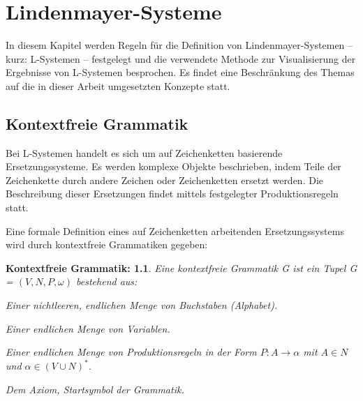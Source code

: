\chapter{Lindenmayer-Systeme} \label{ch:LSysteme}

In diesem Kapitel werden Regeln für die Definition von Lindenmayer-Systemen -- kurz: L-Systemen -- festgelegt und die verwendete Methode zur Visualisierung der Ergebnisse von L-Systemen besprochen. Es findet eine Beschränkung des Themas auf die in dieser Arbeit umgesetzten Konzepte statt.

\section{Kontextfreie Grammatik}

Bei L-Systemen handelt es sich um auf Zeichenketten basierende Ersetzungssysteme. Es werden komplexe Objekte beschrieben, indem Teile der Zeichenkette durch andere Zeichen oder Zeichenketten ersetzt werden. Die Beschreibung dieser Ersetzungen findet mittels festgelegter Produktionsregeln statt. \cite[S.2]{ABOP:04} 

Eine formale Definition eines auf Zeichenketten arbeitenden Ersetzungssystems wird durch kontextfreie Grammatiken gegeben:

\newtheorem{defKontextfreieGrammatik}{Kontextfreie Grammatik:}[chapter]
\begin{defKontextfreieGrammatik}
	Eine kontextfreie Grammatik G ist ein Tupel G = $(V, N, P, \omega)$ bestehend aus:
	
	\begin{description}[labelindent]
		\item[\boldmath$V$] Einer nichtleeren, endlichen Menge von Buchstaben (Alphabet).\\
		
		\item[\boldmath$N$] Einer endlichen Menge von Variablen.\\
		
		\item[\boldmath$P$] Einer endlichen Menge von Produktionsregeln in der Form $P: A \rightarrow \alpha$ mit $A \in N$ und $\alpha \in (V \cup N )^*$.\\
		
		\item[\boldmath$\omega \in N$] Dem Axiom, Startsymbol der Grammatik.\\
		
	\end{description}
	\cite[S.343]{ThI:14}
\end{defKontextfreieGrammatik}

